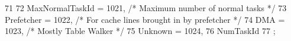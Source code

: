 \begin{DoxyCode}
71                 {
72         MaxNormalTaskId = 1021, /* Maximum number of normal tasks */
73         Prefetcher = 1022, /* For cache lines brought in by prefetcher */
74         DMA = 1023, /* Mostly Table Walker */
75         Unknown = 1024,
76         NumTaskId
77     };
\end{DoxyCode}

